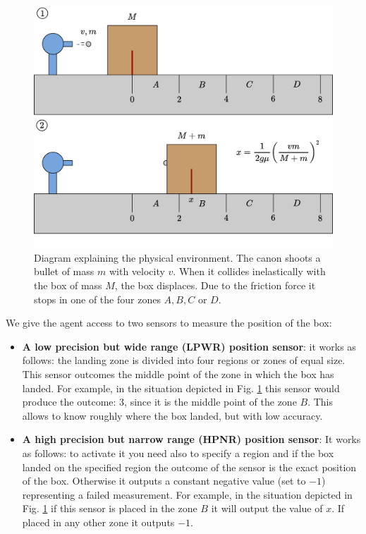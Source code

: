 \documentclass[11pt,a4paper,twoside]{report}
\newcommand{\+}{\textnormal{+} }
\theoremstyle{definition}
\numberwithin{equation}{chapter}
\begin{document}
\begin{figure}[t]
  \centering
  \includegraphics[scale=0.5]{figures/Experiment2.pdf}
  \caption{Diagram explaining the physical environment. The canon shoots a 
  bullet of mass $m$ with velocity $v$. When it collides inelastically with the 
  box of mass $M$, the box displaces. Due to the friction force it stops in
  one of the four zones $A, B, C$ or $D$.}
  \label{fig:Box}
\end{figure}

We give the agent access to two sensors to measure the position of the box:
\begin{itemize}
\item \textbf{A low precision but wide range (LPWR) position  sensor}: it works
as follows: the landing zone is divided into four regions or zones of equal size.
This sensor outcomes the middle point of the zone in which the box has landed.
For example, in the situation depicted in Fig. \ref{fig:Box} this sensor would
produce the outcome: $3$, since it is the middle point of the zone $B$. This
allows to know roughly where the box landed, but with low accuracy. 
\item \textbf{A high precision but narrow range (HPNR) position sensor}: It
works as follows: to activate it you need also to specify a region and if the box
landed on the specified region the outcome of the sensor is the exact position
of the box. Otherwise it outputs a constant negative value (set to $-1$)
representing a failed measurement. For example, in the situation depicted in
Fig. \ref{fig:Box} if this sensor is placed in the zone $B$ it will output the
value of $x$. If placed in any other zone it outputs $-1$.
\end{itemize}
\end{document}
